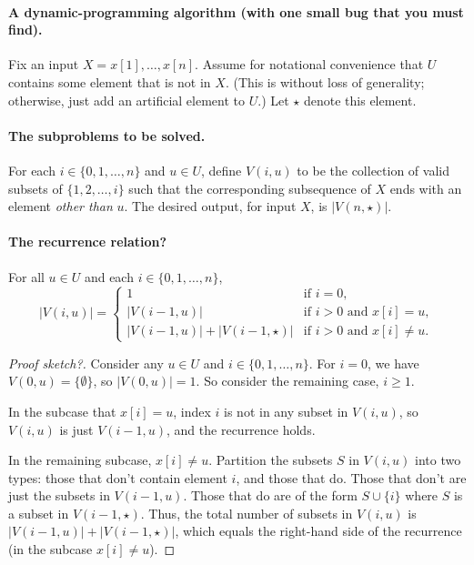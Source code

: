 \documentclass[11pt]{article}
\begin{document}
\paragraph{A dynamic-programming algorithm (with one small bug that you must find).}
Fix an input $X=x[1], \ldots, x[n]$.
Assume for notational convenience that $U$ contains some element that is not in $X$.
(This is without loss of generality; otherwise, just add an artificial element to $U$.)
Let $\star$ denote this element.

\paragraph{The subproblems to be solved.} 
For each $i\in\{0,1,\ldots,n\}$ and $u\in U$,
define $V(i, u)$ to be the collection of valid subsets of $\{1,2,\ldots,i\}$
such that the corresponding subsequence of $X$ ends with an element \emph{other than} $u$.
The desired output, for input $X$, is $|V(n, \star)|$.

\paragraph{The recurrence relation?}
\begin{lemma}
  For all $u\in U$ and each $i \in \{0, 1,\ldots,n\}$,
  \[
  |V(i, u)| =
  \begin{cases}
    1 & \text{if } i = 0, \\
    |V(i-1, u)| & \text{if } i>0 \text{ and } x[i] = u, \\
    |V(i-1, u)| + |V(i-1, \star)|& \text{if } i > 0 \text{ and } x[i] \ne u.
  \end{cases}
  \]
\end{lemma}
\begin{proof}[Proof sketch?]
  Consider any $u\in U$ and $i\in \{0, 1, \ldots, n\}$.
  For $i=0$, we have $V(0, u) = \{\emptyset\}$, so $|V(0, u)| = 1$. 
  So consider the remaining case, $i\ge 1$.
  
  In the subcase that $x[i] = u$,
  index $i$ is not in any subset in $V(i, u)$,
  so $V(i, u)$ is just $V(i-1, u)$, and the recurrence holds.

  In the remaining subcase, $x[i] \ne u$.
  Partition the subsets $S$ in $V(i, u)$ into two types:
  those that don't contain element $i$, and those that do.
  Those that don't are just the subsets in $V(i-1, u)$.
  Those that do are of the form $S\cup\{i\}$
  where $S$ is a subset in $V(i-1,\star)$.
  Thus, the total number of subsets in $V(i,u)$ is $|V(i-1, u)| + |V(i-1, \star)|$,
  which equals the right-hand side of the recurrence (in the subcase $x[i]\ne u$).
  \renewcommand{\qed}{\hfill \framebox{\mbox{\tiny ?}}}
\end{proof}
\end{document}
